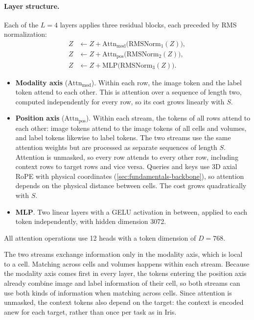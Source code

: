 \documentclass[hidelinks, a4paper, 12pt, ngerman, english]{article}  %
\begin{document}
\paragraph{Layer structure.}
Each of the $L = 4$ layers applies three residual blocks, each preceded by
RMS normalization:
%
\begin{equation}
\begin{aligned}
  Z &\leftarrow Z + \mathrm{Attn}_{\text{mod}}\big(\mathrm{RMSNorm}_1(Z)\big), \\
  Z &\leftarrow Z + \mathrm{Attn}_{\text{pos}}\big(\mathrm{RMSNorm}_2(Z)\big), \\
  Z &\leftarrow Z + \mathrm{MLP}\big(\mathrm{RMSNorm}_3(Z)\big).
\end{aligned}
\label{eq:dual-layer}
\end{equation}
%
\begin{itemize}[leftmargin=1.4em,itemsep=0.1em]
  \item \textbf{Modality axis} ($\mathrm{Attn}_{\text{mod}}$). Within each
    row, the image token and the label token attend to each other. This is
    attention over a sequence of length two, computed independently for every
    row, so its cost grows linearly with $S$.
  \item \textbf{Position axis} ($\mathrm{Attn}_{\text{pos}}$). Within each
    stream, the tokens of all rows attend to each other: image tokens attend
    to the image tokens of all cells and volumes, and label tokens
    likewise to label tokens. The two streams use the same attention weights
    but are processed as separate sequences of length $S$. Attention is
    unmasked, so every row attends to every other row, including context rows
    to target rows and vice versa. Queries and keys use 3D axial RoPE with
    physical coordinates (\autoref{sec:fundamentals-backbone}), so attention
    depends on the physical distance between cells. The cost grows
    quadratically with $S$.
  \item \textbf{MLP}. Two linear layers with a GELU activation in between,
    applied to each token independently, with hidden dimension 3072.
\end{itemize}
%
All attention operations use 12 heads with a token dimension of $D = 768$.

The two streams exchange information only in the modality axis, which is local
to a cell. Matching across cells and volumes happens within each stream.
Because the modality axis comes first in every layer, the tokens entering the
position axis already combine image and label information of their cell, so
both streams can use both kinds of information when matching across cells.
Since attention is unmasked, the context tokens also depend on the target:
the context is encoded anew for each target, rather than once per task as in
Iris.
\end{document}
